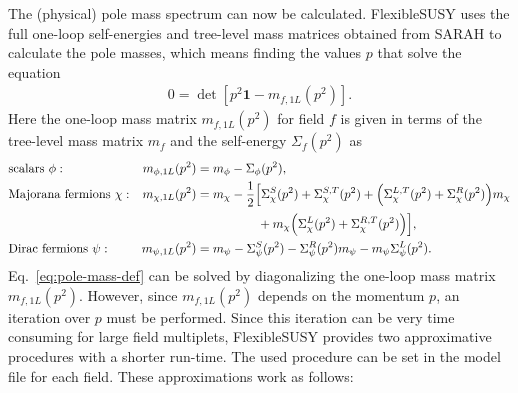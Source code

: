 \documentclass[final,3p,11pt,pdflatex]{elsarticle}
\makeatletter
\newcommand{\fs}{FlexibleSUSY\@\xspace}
\newcommand{\unity}{\mathbf{1}}
\makeatother
\begin{document}
The (physical) pole mass spectrum can now be calculated.  \fs uses the
full one-loop self-energies and tree-level mass matrices obtained from
SARAH to calculate the pole masses, which means finding the values $p$
that solve the equation
%
\begin{align}
  0 = \det\left[p^2\unity - m_{f,1L}(p^2)\right].
  \label{eq:pole-mass-def}
\end{align}
%
Here the one-loop mass matrix $m_{f,1L}(p^2)$ for field $f$ is given
in terms of the tree-level mass matrix $m_f$ and the self-energy
$\Sigma_f(p^2)$ as
%
\begin{align}
  &\text{scalars } \phi: &
  m_{\phi,1L}(p^2) &= m_{\phi} - \Sigma_\phi(p^2), \\
  &\text{Majorana fermions } \chi: &
  m_{\chi,1L}(p^2) &= m_{\chi} - \frac{1}{2}\Big[
    \Sigma_\chi^S(p^2) + \Sigma_\chi^{S,T}(p^2)
    + \Big( \Sigma_\chi^{L,T}(p^2) + \Sigma_\chi^R(p^2) \Big) m_{\chi} \notag \\
    &&&\phantom{= m_{\chi} - \frac{1}{2}\Big[}
    + m_{\chi} \Big( \Sigma_\chi^L(p^2) + \Sigma_\chi^{R,T}(p^2) \Big)
  \Big], \\
  &\text{Dirac fermions } \psi: &
  m_{\psi,1L}(p^2) &= m_{\psi}
  - \Sigma_\psi^S(p^2)
  - \Sigma_\psi^R(p^2) m_{\psi}
  - m_{\psi} \Sigma_\psi^L(p^2) .
\end{align}
%
Eq.~\eqref{eq:pole-mass-def} can be solved by diagonalizing the
one-loop mass matrix $m_{f,1L}(p^2)$.  However, since $m_{f,1L}(p^2)$
depends on the momentum $p$, an iteration over $p$ must be performed.
Since this iteration can be very time consuming for large field
multiplets, \fs provides two approximative procedures with a shorter
run-time.  The used procedure can be set in the model file for each
field.  These approximations work as follows:
%
\end{document}
